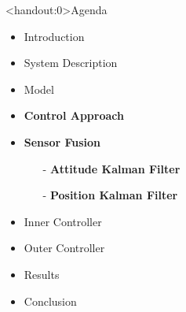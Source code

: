 
\begin{frame}<handout:0>{Agenda}{}
    \begin{itemize}
        \item Introduction
        \item System Description
        \item Model
        \item \textcolor{aaublue}{\textbf{Control Approach}}
        \item \textcolor{aaublue}{\textbf{Sensor Fusion}}
        \begin{itemize}
            \item[-] \textcolor{aaublue}{\textbf{Attitude Kalman Filter}}
            \item[-] \textcolor{aaublue}{\textbf{Position Kalman Filter}}
        \end{itemize}
        \item Inner Controller
        \item Outer Controller
        \item Results
        \item Conclusion
    \end{itemize}
\end{frame}